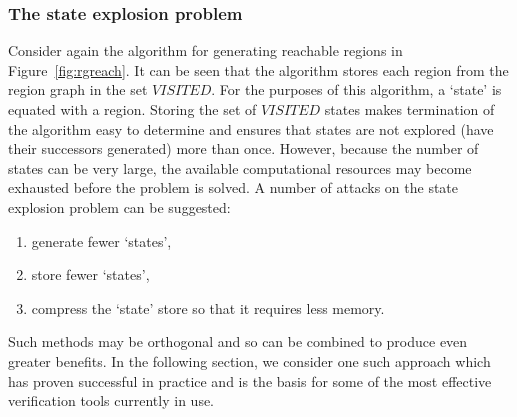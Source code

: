 {\subsubsection{The state explosion problem}
Consider again the algorithm for generating reachable regions in
Figure~\ref{fig:rgreach}. It can be seen that the algorithm stores each
region from the region graph in the set $VISITED$. For the purposes of this
algorithm, a `state' is equated with a region. Storing the set of
$VISITED$ states makes termination of the algorithm easy to
determine and ensures that states are not explored (have their
successors generated) more than once. However, because the number of
states can be very large, the available computational resources may
become exhausted before the problem is solved. A number of attacks on
the state explosion problem can be suggested:
\begin{enumerate}
\item generate fewer `states',
\item store fewer `states',
\item compress the `state' store so that it requires less memory.
\end{enumerate}
Such methods may be orthogonal and so can be combined to produce even
greater benefits.  In the following section, we consider one such
approach which has proven successful in practice and is the basis for
some of the most effective verification tools currently in use.

}
